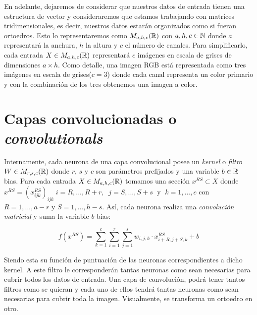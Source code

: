 \begin{itemize}
En adelante, dejaremos de considerar que nuestros datos de entrada tienen una estructura de vector y consideraremos que estamos trabajando con matrices tridimensionales, es decir, nuestros datos estarán organizados como si fueran ortoedros. Esto lo representaremos como $M_{a,h,c}(\mathbb{R})$ con $a,h,c\in \mathbb{N}$ donde $a$ representará la anchura, $h$ la altura y $c$ el número de canales. Para simplificarlo, cada entrada $X\in M_{a,h,c}(\mathbb{R})$ representará $c$ imágenes en escala de grises de dimensiones $a\times h$. Como detalle, una imagen RGB está representada como tres imágenes en escala de grises($c=3$) donde cada canal representa un color primario y con la combinación de los tres obtenemos una imagen a color.

\section{Capas convolucionadas o \emph{convolutionals}}

Internamente, cada neurona de una capa convolucional posee un \emph{kernel} o \emph{filtro} $W\in M_{r,s,c}(\mathbb{R})$ donde $r$, $s$ y $c$ son parámetros prefijados y una variable $b\in\mathbb{R}$ bias. Para cada entrada $X \in M_{a,h,c}(\mathbb{R})$ tomamos una sección $x^{RS} \subset X$ donde $x^{RS}=(x_{ijk}^{RS})_{ijk}\; i=R,...,R+r, \;\; j=S,...,S+s\;$ y $\;k=1,...,c$ con $R=1,...,a-r$ y $S=1,...,h-s$. Así, cada neurona realiza una \emph{convolución matricial} y suma la variable $b$ bias: \newline

$$f(x^{RS})=\sum_{k=1}^{c}\sum_{i=1}^{r} \sum_{j=1}^{s} w_{i,j,k} \cdot x_{i+R,j+S,k}^{RS}+b$$

Siendo esta su función de puntuación de las neuronas correspondientes a dicho kernel. A este filtro le corresponderán tantas neuronas como sean necesarias para cubrir todos los datos de entrada. Una capa de convolución, podrá tener tantos filtros como se quieran y cada uno de ellos tendrá tantas neuronas como sean necesarias para cubrir toda la imagen. Visualmente, se transforma un ortoedro en otro.\newline
\begin{figure}
\centering

\end{figure}
\end{itemize}
